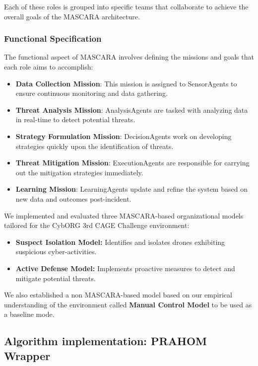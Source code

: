 \documentclass[conference]{IEEEtran}
\begin{document}
Each of these roles is grouped into specific teams that collaborate to achieve the overall goals of the MASCARA architecture.

\subsubsection*{Functional Specification}

The functional aspect of MASCARA involves defining the missions and goals that each role aims to accomplish:

\begin{itemize}
    \item \textbf{Data Collection Mission}: This mission is assigned to SensorAgents to ensure continuous monitoring and data gathering.
    \item \textbf{Threat Analysis Mission}: AnalysisAgents are tasked with analyzing data in real-time to detect potential threats.
    \item \textbf{Strategy Formulation Mission}: DecisionAgents work on developing strategies quickly upon the identification of threats.
    \item \textbf{Threat Mitigation Mission}: ExecutionAgents are responsible for carrying out the mitigation strategies immediately.
    \item \textbf{Learning Mission}: LearningAgents update and refine the system based on new data and outcomes post-incident.
\end{itemize}

We implemented and evaluated three MASCARA-based organizational models tailored for the CybORG 3rd CAGE Challenge environment:

\begin{itemize}
    \item \textbf{Suspect Isolation Model:} Identifies and isolates drones exhibiting suspicious cyber-activities.
    \item \textbf{Active Defense Model:} Implements proactive measures to detect and mitigate potential threats.
\end{itemize}

We also established a non MASCARA-based model based on our empirical understanding of the environment called \textbf{Manual Control Model} to be used as a baseline mode.


\subsection{Algorithm implementation: PRAHOM Wrapper}
\end{document}
